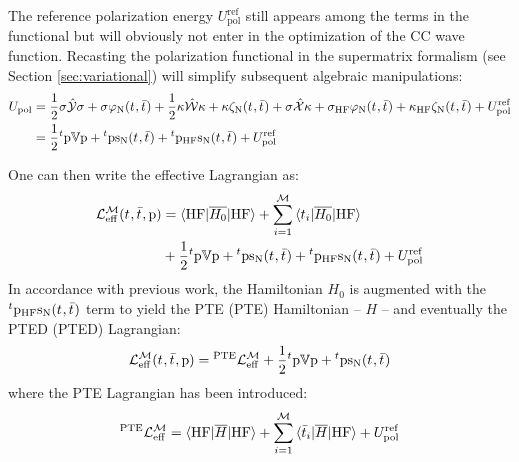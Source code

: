 The reference polarization energy $U_\mathrm{pol}^\mathrm{ref}$ still
appears among the terms in the functional but will obviously not enter
in the optimization of the \acs{CC} wave function.
Recasting the polarization functional in the supermatrix formalism (see
Section \ref{sec:variational}) will simplify subsequent algebraic
manipulations:
\begin{equation}
  \begin{aligned}
  U_\mathrm{pol} &=
    \frac{1}{2}\sigma\hat{\mathcal{Y}}\sigma
    + \sigma\varphi_{\mathrm{N}}(t_{},\bar{t}_{})
  + \frac{1}{2}\kappa\hat{\mathcal{W}}\kappa
  + \kappa\zeta_{\mathrm{N}}(t_{},\bar{t}_{})
  + \sigma\hat{\mathcal{X}}\kappa
  + \sigma_\mathrm{HF}\varphi_{\mathrm{N}}(t_{},\bar{t}_{}) +
  \kappa_\mathrm{HF}\zeta_{\mathrm{N}}(t_{},\bar{t}_{})
  + U_\mathrm{pol}^\mathrm{ref}
  \\
  &=
  \frac{1}{2}{}^t\mathrm{p}\mathbb{V}\mathrm{p} + {}^t\mathrm{p}\mathrm{s}_{\mathrm{N}}(t_{},\bar{t}_{})
  + {}^t\mathrm{p}_\mathrm{HF}\mathrm{s}_{\mathrm{N}}(t_{},\bar{t}_{})
  + U_\mathrm{pol}^\mathrm{ref}
\end{aligned}
\end{equation}

One can then write the effective Lagrangian as:
\begin{equation}
  \begin{aligned}
  \mathcal{L}^\mathcal{M}_\mathrm{eff}(t_{}, \bar{t}_{}, \mathrm{p}) &=
  \braket{\mathrm{HF} | \overline{H_0} | \mathrm{HF}}
  + \sum_{i=1}^{\mathcal{M}}\braket{t_{i} | \overline{H_0} | \mathrm{HF}} \\
  &+
  \frac{1}{2}{}^t\mathrm{p}\mathbb{V}\mathrm{p} + {}^t\mathrm{p}\mathrm{s}_{\mathrm{N}}(t_{},\bar{t}_{})
  + {}^t\mathrm{p}_\mathrm{HF}\mathrm{s}_{\mathrm{N}}(t_{},\bar{t}_{})
  + U_\mathrm{pol}^\mathrm{ref}
  \end{aligned}
\end{equation}
In accordance with previous work,\autocite{Cammi2009-gu,
Caricato2011-tx} the Hamiltonian $H_0$ is augmented with the
${}^t\mathrm{p}_\mathrm{HF}\mathrm{s}_{\mathrm{N}}(t_{},\bar{t}_{})$ term to yield the
\acl{PTE} (\acs{PTE}) Hamiltonian -- $H$ -- and eventually the
\acl{PTED} (\acs{PTED}) Lagrangian:~\autocite{Olivares del Valle,
Lipparini}
\begin{equation}\label{eq:pted-cc}
  \mathcal{L}^\mathcal{M}_\mathrm{eff}(t_{}, \bar{t}_{}, \mathrm{p}) =
  {}^\mathrm{PTE}\mathcal{L}^\mathcal{M}_\mathrm{eff}
  + \frac{1}{2}{}^t\mathrm{p}\mathbb{V}\mathrm{p} + {}^t\mathrm{p}\mathrm{s}_{\mathrm{N}}(t_{},\bar{t}_{})
\end{equation}
where the \acs{PTE} Lagrangian has been introduced:
\begin{equation}
{}^\mathrm{PTE}\mathcal{L}^\mathcal{M}_\mathrm{eff}
  =
  \braket{\mathrm{HF} | \overline{H} | \mathrm{HF}}
  + \sum_{i=1}^{\mathcal{M}}\braket{\bar{t}_{i} | \overline{H} | \mathrm{HF}}
  + U_\mathrm{pol}^\mathrm{ref}
\end{equation}


